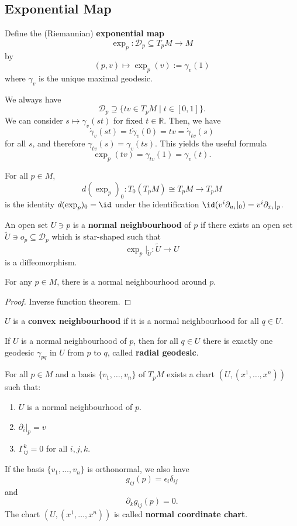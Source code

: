 \subsection*{Exponential Map}
\begin{definition}
    Define the (Riemannian) \textbf{exponential map}
    \[
    \exp_p: \mathcal{D}_p \subseteq T_pM \to M
    \] by
    \[
        (p,v) \mapsto \exp_p(v) := \gamma_v(1)
    \] where $\gamma_v$ is the unique maximal geodesic.
\end{definition}
We always have \[
    \mathcal{D}_p \supseteq \{tv \in T_pM \mid t \in [0,1]\} 
.\] 
We can consider $s \mapsto \gamma_v(st)$ for fixed $t \in \mathbb{R}$. Then, we have \[
    \dot{\gamma}_v(st)=t\dot{\gamma}_v(0)=tv=\dot{\gamma}_{tv}(s)
\] for all $s$, and therefore $\gamma_{tv}(s)=\gamma_v(ts)$. This yields the useful formula \[
\exp_p(tv)=\gamma_{tv}(1)=\gamma_v(t)
.\] 
\begin{lemma}
    For all $p \in M$, \[
    d(\exp_p)_0: T_0(T_pM) \cong T_pM \to T_pM
\] is the identity $d(\exp_p)_0 = \id$ under the identification $\id(v^i \partial_{u_i}|_0)=v^i \partial_{x_i}|_p$.
\end{lemma}
\begin{definition}
    An open set $U \ni p$ is a \textbf{normal neighbourhood}  of $p$ if there exists an open set $\tilde{U} \ni o_p \subseteq \mathcal{D}_p$ which is star-shaped such that \[
        \exp_p|_{\tilde{U}}: \tilde{U} \to U
    \] is a diffeomorphism.
\end{definition}
\begin{theorem}
    For any $p \in M$, there is a normal neighbourhood around $p$. 
\end{theorem}
\begin{proof}
    Inverse function theorem.
\end{proof}
\begin{definition}
    $U$ is a \textbf{convex neighbourhood} if it is a normal neighbourhood for all $q \in U$.
\end{definition}
\begin{remark}
    If $U$ is a normal neighbourhood of $p$, then for all $q \in U$ there is exactly one geodesic $\gamma_{pq}$ in $U$ from $p$ to $q$, called \textbf{radial geodesic}.
\end{remark}
\begin{theorem}
    For all $p \in M$ and a basis $\{v_1, \dots, v_n\}$ of $T_pM$ exists a chart $(U, (x^1, \dots, x^n))$ such that:
    \begin{enumerate}
        \item $U$ is a normal neighbourhood of $p$.
        \item $\partial_i|_p = v$
        \item $\Gamma_{ij}^k =0$ for all $i,j,k$.
    \end{enumerate}
If the basis $\{v_1, \dots, v_n \}$ is orthonormal, we also have \[
    g_{ij}(p)=\epsilon_i \delta_{ij}
\] and \[
\partial_k g_{ij}(p)=0
.\]  The chart $(U,(x^1, \dots, x^n))$ is called \textbf{normal coordinate chart}.
\end{theorem}
